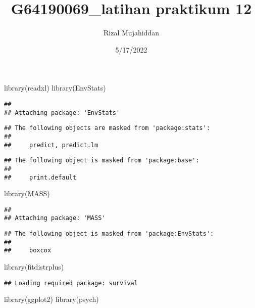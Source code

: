 \documentclass[
]{article}
\title{G64190069\_latihan praktikum 12}
\author{Rizal Mujahiddan}
\date{5/17/2022}
\newenvironment{Shaded}{\begin{snugshade}}{\end{snugshade}}
\newcommand{\FunctionTok}[1]{\textcolor[rgb]{0.00,0.00,0.00}{#1}}
\newcommand{\NormalTok}[1]{#1}
\begin{document}
\maketitle

\begin{Shaded}
\begin{Highlighting}[]
\FunctionTok{library}\NormalTok{(readxl)}
\FunctionTok{library}\NormalTok{(EnvStats)}
\end{Highlighting}
\end{Shaded}

\begin{verbatim}
## 
## Attaching package: 'EnvStats'
\end{verbatim}

\begin{verbatim}
## The following objects are masked from 'package:stats':
## 
##     predict, predict.lm
\end{verbatim}

\begin{verbatim}
## The following object is masked from 'package:base':
## 
##     print.default
\end{verbatim}

\begin{Shaded}
\begin{Highlighting}[]
\FunctionTok{library}\NormalTok{(MASS)}
\end{Highlighting}
\end{Shaded}

\begin{verbatim}
## 
## Attaching package: 'MASS'
\end{verbatim}

\begin{verbatim}
## The following object is masked from 'package:EnvStats':
## 
##     boxcox
\end{verbatim}

\begin{Shaded}
\begin{Highlighting}[]
\FunctionTok{library}\NormalTok{(fitdistrplus)}
\end{Highlighting}
\end{Shaded}

\begin{verbatim}
## Loading required package: survival
\end{verbatim}

\begin{Shaded}
\begin{Highlighting}[]
\FunctionTok{library}\NormalTok{(ggplot2)}
\FunctionTok{library}\NormalTok{(psych)}
\end{Highlighting}
\end{Shaded}
\end{document}
